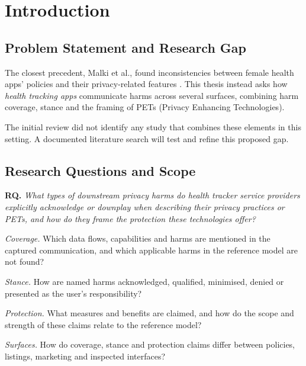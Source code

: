 \documentclass[twoside,its]{bossthesis}
\makeatletter
\newif\ifshowhighlights
\def\hl@ulpreamble{\SOUL@hlpreamble
  \hl@lnht=-\SOUL@uldp \advance\hl@lnht by \hl@lnthick}
\def\hl@ulleaders{\xleaders\hbox to 1pt{%
  \rlap{\vrule width 1.2pt height \SOUL@ulht depth \SOUL@uldp}%
  \rlap{\textcolor{todoline}{\vrule width 1.2pt height \hl@lnht depth \SOUL@uldp}}\hss}}
\DeclareRobustCommand*\texthlul{\SOUL@hlsetup
  \let\SOUL@preamble\hl@ulpreamble \let\SOUL@ulleaders\hl@ulleaders \SOUL@}
\newcommand{\hl@plain}[2]{{\sethlcolor{#1}\hl{#2}}}
\newcommand{\hl@marked}[2]{{\sethlcolor{#1}\texthlul{#2}}}
\newcommand{\hl@off}[2]{#2}
\newcommand{\hl@on}[2]{\@ifnextchar\todo{\hl@marked{#1}{#2}}{\hl@plain{#1}{#2}}}
\newcommand{\highlight}[2][yellow]{%
  \ifshowhighlights
    \expandafter\hl@on %
  \else
    \expandafter\hl@off
  \fi
  {#1}{#2}}
\makeatother
\begin{document}
\chapter{Introduction}
\label{ch:introduction}

\section{Problem Statement and Research Gap}
The closest precedent, Malki et al., found inconsistencies between female
health apps' policies and their privacy-related features
\parencite{malki2024exploring}. This thesis instead asks how \emph{health tracking apps} communicate harms across several surfaces, combining harm
coverage, stance and the framing of PETs (Privacy Enhancing Technologies). \highlight[orange!25]{The initial review did not identify any study that combines these elements in this setting. A documented literature search will test and refine this proposed gap.}

\section{Research Questions and Scope}
\noindent\textbf{RQ.} \emph{What types of downstream privacy harms do health
tracker service providers explicitly acknowledge or downplay when describing
their privacy practices or PETs, and how do they frame the protection these
technologies offer?}

\begin{description}[leftmargin=1.5em,itemsep=1pt,topsep=3pt,
                    labelindent=0pt,font=\normalfont\bfseries]
  \item[RQ1] \textit{Coverage.} Which data flows, capabilities and harms are
    mentioned in the captured communication, and which applicable harms
    in the reference model are not found?
  \item[RQ2] \textit{Stance.} How are named harms acknowledged, qualified,
    minimised, denied or presented as the user's responsibility?
  \item[RQ3] \textit{Protection.} What measures and benefits are claimed,
    and how do the scope and strength of these claims relate to the
    reference model?
  \item[RQ4] \textit{Surfaces.} How do coverage, stance and protection claims
    differ between policies, listings, marketing and inspected interfaces?
\end{description}
\end{document}
